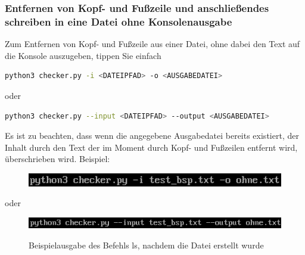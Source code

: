 \documentclass[12pt]{scrartcl}
\begin{document}
\subsubsection{Entfernen von Kopf- und Fußzeile und anschließendes schreiben in eine Datei ohne Konsolenausgabe}
\label{sec:first-steps-extraction-file-without}
Zum Entfernen von Kopf- und Fußzeile aus einer Datei, ohne dabei den Text auf die Konsole auszugeben, tippen Sie einfach 
\begin{lstlisting}[language=bash]
python3 checker.py -i <DATEIPFAD> -o <AUSGABEDATEI>
\end{lstlisting}
\begin{center}
oder
\end{center}
\begin{lstlisting}[language=bash]
python3 checker.py --input <DATEIPFAD> --output <AUSGABEDATEI>
\end{lstlisting} 
Es ist zu beachten, dass wenn die angegebene Ausgabedatei bereits existiert, der Inhalt durch den Text der im Moment durch Kopf- und Fußzeilen entfernt wird, überschrieben wird. 
Beispiel:
\begin{figure}[htbp]\includegraphics[width=1.0\textwidth]{ersteSchritteKopfFussIntoFileWithoutConsole002}\par\vspace{0.25cm}
\label{fig:ersteSchritteKopfFussIntoFileWithoutConsole002}
\end{figure}
\begin{center}
oder
\end{center}
\begin{figure}[htbp]
\includegraphics[width=1.0\textwidth]{ersteSchritteKopfFussIntoFileWithoutConsole001}\par
\vspace{0.25cm}
\label{fig:ersteSchritteKopfFussIntoFileWithoutConsole001}
\end{figure}
\begin{figure}[htbp]
\centering
\caption{Beispielausgabe des Befehls ls, nachdem die Datei erstellt wurde}
\label{fig:ersteSchritteExtractIntoFileWithoutConsole003}
\end{figure}
\newpage
\end{document}
